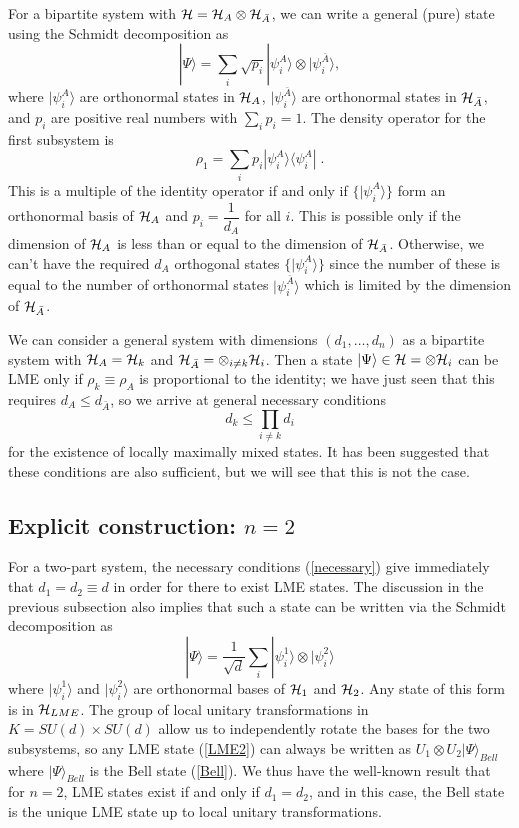 \documentclass[12pt]{article}
\theoremstyle{definition}
\newcommand{\be}{\begin{equation}}
\newcommand{\ee}{\end{equation}}
\begin{document}
For a bipartite system with ${\cal H} = {\cal H}_A  \otimes {\cal H}_{\bar{A}}$, we can write a general (pure) state using the Schmidt decomposition as
\be
|\Psi \rangle = \sum_i \sqrt{p_i} |\psi_i^A \rangle  \otimes |\psi_i^{\bar{A}} \rangle,
\ee
where $|\psi_i^A\rangle$ are orthonormal states in ${\cal H}_A$, $|\psi_i^{\bar{A}} \rangle$ are orthonormal states in ${\cal H}_{\bar{A}}$, and $p_i$ are positive real numbers with $\sum_i p_i = 1$. The density operator for the first subsystem is
\be
\rho_1 = \sum_i p_i |\psi_i^A \rangle \langle \psi_i^A| \; .
\ee
This is a multiple of the identity operator if and only if $\{|\psi_i^A \rangle\}$ form an orthonormal basis of ${\cal H}_A$ and $p_i = \dfrac{1}{ d_A}$ for all $i$. This is possible only if the dimension of ${\cal H}_A$ is less than or equal to the dimension of ${\cal H}_{\bar{A}}$. Otherwise, we can't have the required $d_A$ orthogonal states $\{|\psi_i^A \rangle\}$ since the number of these is equal to the number of orthonormal states $|\psi_i^{\bar{A}} \rangle$ which is limited by the dimension of ${\cal H}_{\bar{A}}$.

We can consider a general system with dimensions $(d_1,\dots, d_n)$ as a bipartite system with ${\cal H}_A = {\cal H}_k$ and ${\cal H}_{\bar{A}} =  \otimes_{i \ne k} {\cal H}_i$. Then a state $|\Psi \rangle \in {\cal H} =  \otimes {\cal H}_i$ can be LME only if $\rho_k \equiv \rho_A$ is proportional to the identity; we have just seen that this requires $d_A \le d_{\bar{A}}$, so we arrive at general necessary conditions
\be
\label{necessary}
d_k \le \prod_{i \ne k} d_i
\ee
for the existence of locally maximally mixed states. It has been suggested that these conditions are also sufficient, but we will see that this is not the case.

\subsection{Explicit construction: $n=2$}

For a two-part system, the necessary conditions (\ref{necessary}) give
immediately that $d_1 = d_2 \equiv d$ in order for there to exist LME
states. The discussion in the previous subsection also implies that
such a state can be written via the Schmidt decomposition as
\be
\label{LME2} |\Psi \rangle = \frac{1}{\sqrt{d}} \sum_i |\psi_i^1
\rangle  \otimes |\psi_i^2 \rangle \ee
where $|\psi_i^1 \rangle$ and
$|\psi_i^2 \rangle$ are orthonormal bases of ${\cal H}_1$ and ${\cal
H}_2$. Any state of this form is in ${\cal H}_{LME}$. The group of
local unitary transformations in $K = SU(d) \times SU(d)$ allow us to
independently rotate the bases for the two subsystems, so any LME
state (\ref{LME2}) can always be written as $U_1  \otimes U_2 |\Psi
\rangle_{Bell}$ where $|\Psi \rangle_{Bell}$ is the Bell state
(\ref{Bell}). We thus have the well-known result that for $n=2$, LME
states exist if and only if $d_1 = d_2$, and in this case, the Bell
state is the unique LME state up to local unitary transformations.
\end{document}
